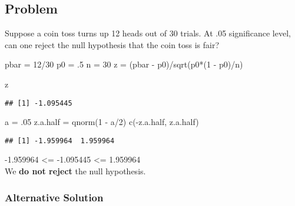 \documentclass[
]{article}
\newenvironment{Shaded}{\begin{snugshade}}{\end{snugshade}}
\newcommand{\DecValTok}[1]{\textcolor[rgb]{0.00,0.00,0.81}{#1}}
\newcommand{\FunctionTok}[1]{\textcolor[rgb]{0.00,0.00,0.00}{#1}}
\newcommand{\NormalTok}[1]{#1}
\newcommand{\OtherTok}[1]{\textcolor[rgb]{0.56,0.35,0.01}{#1}}
\newcommand{\SpecialCharTok}[1]{\textcolor[rgb]{0.00,0.00,0.00}{#1}}
\begin{document}
\hypertarget{problem-18}{%
\subsection{Problem}\label{problem-18}}

Suppose a coin toss turns up 12 heads out of 30 trials. At .05
significance level, can one reject the null hypothesis that the coin
toss is fair?

\begin{Shaded}
\begin{Highlighting}[]
\NormalTok{pbar }\OtherTok{=} \DecValTok{12}\SpecialCharTok{/}\DecValTok{30}
\NormalTok{p0 }\OtherTok{=}\NormalTok{ .}\DecValTok{5}
\NormalTok{n }\OtherTok{=} \DecValTok{30}
\NormalTok{z }\OtherTok{=}\NormalTok{ (pbar }\SpecialCharTok{{-}}\NormalTok{ p0)}\SpecialCharTok{/}\FunctionTok{sqrt}\NormalTok{(p0}\SpecialCharTok{*}\NormalTok{(}\DecValTok{1} \SpecialCharTok{{-}}\NormalTok{ p0)}\SpecialCharTok{/}\NormalTok{n)}

\NormalTok{z}
\end{Highlighting}
\end{Shaded}

\begin{verbatim}
## [1] -1.095445
\end{verbatim}

\begin{Shaded}
\begin{Highlighting}[]
\NormalTok{a }\OtherTok{=}\NormalTok{ .}\DecValTok{05}
\NormalTok{z.a.half }\OtherTok{=} \FunctionTok{qnorm}\NormalTok{(}\DecValTok{1} \SpecialCharTok{{-}}\NormalTok{ a}\SpecialCharTok{/}\DecValTok{2}\NormalTok{)}
\FunctionTok{c}\NormalTok{(}\SpecialCharTok{{-}}\NormalTok{z.a.half, z.a.half)}
\end{Highlighting}
\end{Shaded}

\begin{verbatim}
## [1] -1.959964  1.959964
\end{verbatim}

-1.959964 \textless= -1.095445 \textless= 1.959964\\
We \textbf{do not reject} the null hypothesis.

\hypertarget{alternative-solution-2}{%
\subsubsection{Alternative Solution}\label{alternative-solution-2}}
\end{document}
